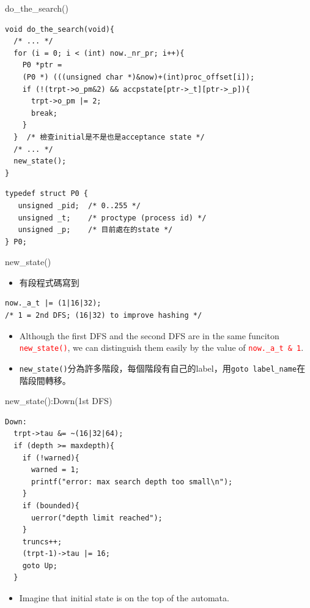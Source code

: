 \documentclass[12pt]{beamer}
\newcommand{\code}[1]{\texttt{#1}}
\begin{document}
\begin{frame}[fragile]{do\_the\_search()}
\begin{lstlisting}[basicstyle=\footnotesize\ttfamily]
void do_the_search(void){
  /* ... */
  for (i = 0; i < (int) now._nr_pr; i++){
    P0 *ptr = 
    (P0 *) (((unsigned char *)&now)+(int)proc_offset[i]);
    if (!(trpt->o_pm&2) && accpstate[ptr->_t][ptr->_p]){
      trpt->o_pm |= 2;
      break;
    }
  }  /* 檢查initial是不是也是acceptance state */
  /* ... */
  new_state();
}
\end{lstlisting}
\begin{lstlisting}[basicstyle=\footnotesize\ttfamily]
typedef struct P0 {
   unsigned _pid;  /* 0..255 */
   unsigned _t;    /* proctype (process id) */
   unsigned _p;    /* 目前處在的state */
} P0;
\end{lstlisting}
\end{frame}

\begin{frame}[fragile]{new\_state()}
\begin{itemize}
	\item 有段程式碼寫到
\end{itemize}
\begin{lstlisting}[basicstyle=\normalsize\ttfamily]
now._a_t |= (1|16|32);
/* 1 = 2nd DFS; (16|32) to improve hashing */
\end{lstlisting}
\begin{itemize}
	\item Although the first DFS and the second DFS are in the same funciton \textcolor{red}{\code{new\_state()}}, we can distinguish them easily by the value of \textcolor{red}{\code{now.\_a\_t \& 1}}.
	\item \code{new\_state()}分為許多階段，每個階段有自己的label，用\code{goto label\_name}在階段間轉移。
\end{itemize}
\end{frame}

\begin{frame}[fragile]{new\_state():Down(1st DFS)}
\begin{lstlisting}[basicstyle=\footnotesize\ttfamily]
Down:
  trpt->tau &= ~(16|32|64);
  if (depth >= maxdepth){
    if (!warned){ 
      warned = 1;
      printf("error: max search depth too small\n");
    }
    if (bounded){ 
      uerror("depth limit reached");
    }
    truncs++;
    (trpt-1)->tau |= 16;
    goto Up;
  }
\end{lstlisting}
\begin{itemize}
	\item Imagine that initial state is on the top of the automata.
\end{itemize}
\end{frame}
\end{document}
